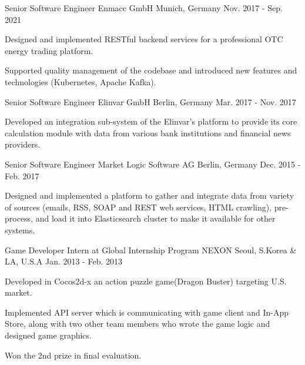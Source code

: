 \begin{cventries}
    \cventry
    {Senior Software Engineer} %
    {Enmacc GmbH} %
    {Munich, Germany} %
    {Nov. 2017 - Sep. 2021} %
    {
        \begin{cvitems} %
            \item {Designed and implemented RESTful backend services for a professional OTC energy trading platform.}
            \item {Supported quality management of the codebase and introduced new features and technologies (Kubernetes, Apache Kafka).}
        \end{cvitems}
    }

    \cventry
    {Senior Software Engineer} %
    {Elinvar GmbH} %
    {Berlin, Germany} %
    {Mar. 2017 - Nov. 2017} %
    {
        \begin{cvitems} %
            \item {Developed an integration sub-system of the Elinvar's platform to provide its core calculation module with data from various bank institutions and financial news providers.}
        \end{cvitems}
    }

    \cventry
    {Senior Software Engineer} %
    {Market Logic Software AG} %
    {Berlin, Germany} %
    {Dec. 2015 - Feb. 2017} %
    {
        \begin{cvitems} %
            \item {Designed and implemented a platform to gather and integrate data from variety of sources (emails, RSS, SOAP and REST web services, HTML crawling), pre-process, and load it into Elasticsearch cluster to make it available for other systems.}
        \end{cvitems}
    }

    \cventry
    {Game Developer Intern at Global Internship Program} %
    {NEXON} %
    {Seoul, S.Korea \& LA, U.S.A} %
    {Jan. 2013 - Feb. 2013} %
    {
        \begin{cvitems} %
            \item {Developed in Cocos2d-x an action puzzle game(Dragon Buster) targeting U.S. market.}
            \item {Implemented API server which is communicating with game client and In-App Store, along with two other team members who wrote the game logic and designed game graphics.}
            \item {Won the 2nd prize in final evaluation.}
        \end{cvitems}
    }


\end{cventries}
